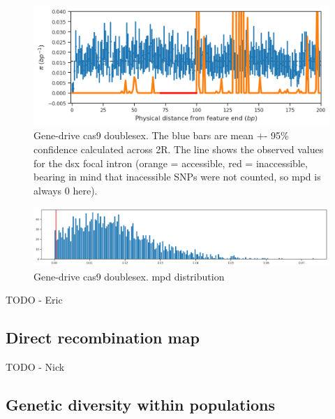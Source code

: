 \documentclass[a4paper,11pt,abstracton,hidelinks]{scrartcl}
\begin{document}
\begin{figure}[H]
	\begin{center}
		\includegraphics*[width=5.5in]{artwork/temp-cas9dsx/cas9dsx1.png}
	\end{center}
	\caption{Gene-drive cas9 doublesex. The blue bars are mean +- 95\% confidence calculated across 2R. The line shows the observed values for the dsx focal intron (orange = accessible, red = inaccessible, bearing in mind that inacessible SNPs were not counted, so mpd is always 0 here).}
	\label{dsx1}
\end{figure}

\begin{figure}[H]
	\begin{center}
		\includegraphics*[width=5.5in]{artwork/temp-cas9dsx/cas9dsx2.png}
	\end{center}
	\caption{Gene-drive cas9 doublesex. mpd distribution}
	\label{dsx2}
\end{figure}


TODO - Eric

\subsection*{Direct recombination map}

TODO - Nick

\subsection*{Genetic diversity within populations}
\end{document}

